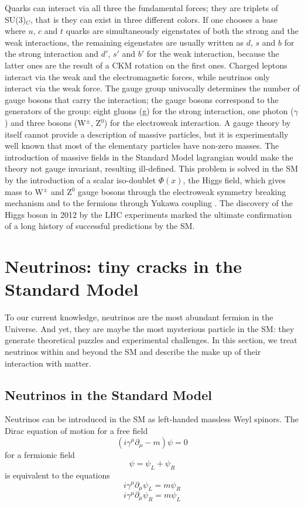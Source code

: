Quarks can interact via all three the fundamental forces; they are triplets of SU(3)$_C$, that is they can exist in three different colors. If one chooses a base where $u$, $c$ and $t$ quarks are simultaneously eigenstates of both the strong and the weak interactions, the remaining eigenstates are usually written as $d$, $s$ and $b$ for the strong interaction and $d'$, $s'$ and $b'$ for the weak interaction, because the latter ones are the result of a CKM rotation on the first ones.
Charged leptons interact via the weak and the electromagnetic forces, while neutrinos only interact via the weak force. 
The gauge group univocally determines the number of gauge bosons that carry the interaction; the gauge bosons correspond to the generators of the group: eight gluons (g) for the strong interaction, one photon ($\gamma$) and three bosons (W$^\pm$, Z$^0$) for the electroweak interaction.
A gauge theory by itself cannot provide a description of massive particles, but it is experimentally well known that most of the elementary particles have non-zero masses. The introduction of massive fields in the Standard Model lagrangian would make the theory not gauge invariant, resulting ill-defined. This problem is solved in the SM by the introduction of a scalar iso-doublet $\Phi(x)$, the Higgs field, which gives mass to W$^\pm$ and Z$^0$ gauge bosons through the electroweak symmetry breaking mechanism and to the fermions through Yukawa coupling \cite{Higgs1964,Higgs19642}.  The discovery of the Higgs boson in 2012 by the LHC experiments \cite{201230,Aad2012} marked the ultimate confirmation  of a long history of successful predictions by the SM.

\section{Neutrinos:  tiny cracks in the Standard Model}\label{ch:nus}
To our current knowledge, neutrinos are the most abundant fermion in the Universe. And yet, they are maybe the most mysterious particle in the SM: they generate theoretical puzzles and experimental challenges. In this section, we treat neutrinos within and beyond the SM and describe the make up of their interaction with matter.

\subsection{Neutrinos in the Standard Model}
Neutrinos can be introduced in the SM as left-handed massless Weyl spinors.
The Dirac equation of motion for a free field
\begin{equation}
(i\gamma^ \mu \partial_\mu - m) \psi = 0
\end{equation}
for a fermionic field 
\begin{equation}
 \psi =  \psi_L +  \psi_R
\end{equation}
is equivalent to the equations
\begin{equation}
i\gamma^ \mu \partial_\mu  \psi_L = m \psi_R
\label{eq:15}
\end{equation}
\begin{equation}
i\gamma^ \mu \partial_\mu  \psi_R = m \psi_L
\label{eq:16}
\end{equation}

